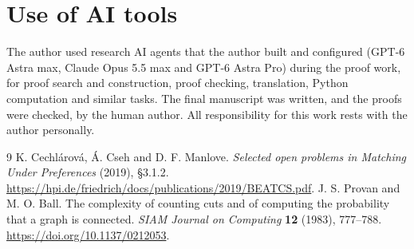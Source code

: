 \documentclass[11pt]{article}
\begin{document}
\section*{Use of AI tools}
The author used research AI agents that the author built and configured (GPT-6 Astra max,
Claude Opus 5.5 max and GPT-6 Astra Pro) during the proof work, for proof search and
construction, proof checking, translation, Python computation and similar tasks. The final
manuscript was written, and the proofs were checked, by the human author. All responsibility
for this work rests with the author personally.

\begin{thebibliography}{9}
 K. Cechl\'arov\'a, \'A. Cseh and D. F. Manlove.
\emph{Selected open problems in Matching Under Preferences} (2019), \S3.1.2.
\url{https://hpi.de/friedrich/docs/publications/2019/BEATCS.pdf}.
 J. S. Provan and M. O. Ball.
The complexity of counting cuts and of computing the probability that a graph is connected.
\emph{SIAM Journal on Computing} \textbf{12} (1983), 777--788.
\url{https://doi.org/10.1137/0212053}.
\end{thebibliography}
\end{document}
